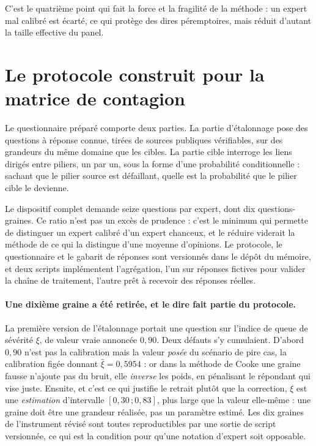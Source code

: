 C'est le quatrième point qui fait la force et la fragilité de la méthode : un expert mal
calibré est écarté, ce qui protège des dires péremptoires, mais réduit d'autant la taille
effective du panel.

\section{Le protocole construit pour la matrice de contagion}

Le questionnaire préparé comporte deux parties. La partie d'étalonnage pose des
questions à réponse connue, tirées de sources publiques vérifiables, sur des grandeurs du même
domaine que les cibles. La partie cible interroge les liens dirigés entre piliers, un
par un, sous la forme d'une probabilité conditionnelle : sachant que le pilier source est
défaillant, quelle est la probabilité que le pilier cible le devienne.

Le dispositif complet demande seize questions par expert, dont dix questions-graines. Ce ratio
n'est pas un excès de prudence : c'est le minimum qui permette de distinguer un expert calibré
d'un expert chanceux, et le réduire viderait la méthode de ce qui la distingue d'une moyenne
d'opinions. Le protocole, le questionnaire et le gabarit de réponses sont versionnés dans le
dépôt du mémoire, et deux scripts implémentent l'agrégation, l'un sur réponses fictives pour
valider la chaîne de traitement, l'autre prêt à recevoir des réponses réelles.

\paragraph{Une dixième graine a été retirée, et le dire fait partie du protocole.} La première
version de l'étalonnage portait une question sur l'indice de queue de sévérité $\xi$, de valeur
vraie annoncée $0{,}90$. Deux défauts s'y cumulaient. D'abord $0{,}90$ n'est pas la calibration
mais la valeur \emph{posée} du scénario de pire cas, la calibration figée donnant
$\hat\xi = 0{,}5954$ : or dans la méthode de Cooke une graine fausse n'ajoute pas du bruit, elle
\emph{inverse} les poids, en pénalisant le répondant qui vise juste. Ensuite, et c'est ce qui
justifie le retrait plutôt que la correction, $\xi$ est une \emph{estimation} d'intervalle
$[0{,}30\,;0{,}83]$, plus large que la valeur elle-même : une graine doit être une grandeur
réalisée, pas un paramètre estimé. Les dix graines de l'instrument révisé sont toutes reproductibles par une
sortie de script versionnée, ce qui est la condition pour qu'une notation d'expert soit
opposable.

